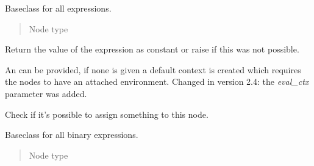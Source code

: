 \documentclass[a4paper,10pt,english]{sphinxmanual}
\begin{document}

\begin{fulllineitems}
\label{extensions:jinja2.nodes.Expr}
Baseclass for all expressions.
\begin{quote}\begin{description}
\item[{Node type}] \leavevmode
{\hyperref[extensions:jinja2.nodes.Node]{}}

\end{description}\end{quote}

\begin{fulllineitems}
\label{extensions:jinja2.nodes.Expr.as_const}
Return the value of the expression as constant or raise
{\hyperref[extensions:jinja2.nodes.Impossible]{}} if this was not possible.

An {\hyperref[api:jinja2.nodes.EvalContext]{}} can be provided, if none is given
a default context is created which requires the nodes to have
an attached environment.
Changed in version 2.4: the \emph{eval\_ctx} parameter was added.
\end{fulllineitems}


\begin{fulllineitems}
\label{extensions:jinja2.nodes.Expr.can_assign}
Check if it's possible to assign something to this node.

\end{fulllineitems}


\end{fulllineitems}


\begin{fulllineitems}
\label{extensions:jinja2.nodes.BinExpr}
Baseclass for all binary expressions.
\begin{quote}\begin{description}
\item[{Node type}] \leavevmode
{\hyperref[extensions:jinja2.nodes.Expr]{}}

\end{description}\end{quote}

\end{fulllineitems}
\end{document}
